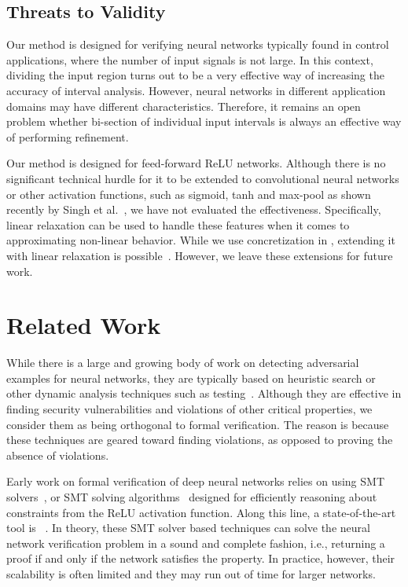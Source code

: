 \subsection{Threats to Validity}


Our method is designed for verifying neural networks typically found
in control applications, where the number of input signals is not
large. In this context, dividing the input region turns out to be a
very effective way of increasing the accuracy of interval analysis.
However, neural networks in different application domains may have
different characteristics.  Therefore, it remains an open problem
whether bi-section of individual input intervals is always an
effective way of performing refinement.


Our method is designed for feed-forward ReLU networks.  Although there
is no significant technical hurdle for it to be extended to
convolutional neural networks or other activation functions, such as
sigmoid, tanh and max-pool as shown recently by Singh et
al.~\cite{SinghGPV19}, we have not evaluated the effectiveness.
Specifically, linear relaxation can be used to handle these features
when it comes to approximating non-linear behavior.  While we use
concretization in \diffNN{}, extending it with linear relaxation is
possible~\cite{WangPWYJ18nips}. However, we leave these extensions for
future work.


\section{Related Work}
\label{sec:related}

While there is a large and growing body of work on detecting
adversarial examples for neural networks, they are typically based on
heuristic search or other dynamic analysis techniques such as
testing~\cite{CarliniW17,PeiCYJ17,TianPJR18,SunWRHKK18,WickerHK18,MaLLZG18}.
Although they are effective in finding security vulnerabilities and
violations of other critical properties, we consider them as being
orthogonal to formal verification.  The reason is because these
techniques are geared toward finding violations, as opposed to proving
the absence of violations.


Early work on formal verification of deep neural networks relies on
using SMT solvers~\cite{HuangKWW17,Ehlers17}, or SMT solving
algorithms~\cite{KatzBDJK17,KatzHIJLLSTWZDK19} designed for
efficiently reasoning about constraints from the ReLU activation
function. Along this line, a state-of-the-art tool
is \Reluplex{}~\cite{KatzBDJK17}.  In theory, these SMT solver based
techniques can solve the neural network verification problem in a
sound and complete fashion, i.e., returning a proof if and only if the
network satisfies the property.  In practice, however, their
scalability is often limited and they may run out of time for larger
networks.



